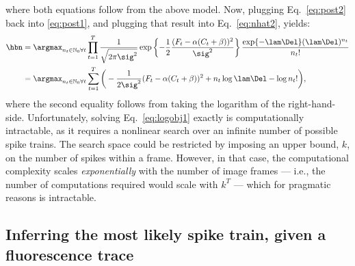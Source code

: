 where both equations follow from the above model.  Now, plugging Eq.~\eqref{eq:post2} back into \eqref{eq:post1}, and plugging that result into Eq.~\eqref{eq:nhat2}, yields:
\begin{subequations}  \label{eq:obj}
\begin{align}
\hbn 	&= \anx \prod_{t=1}^T \frac{1}{\sqrt{2 \pi \sig^2}} \exp \left\{-\frac{1}{2}\frac{(F_t - \alpha (C_t + \beta))^2}{\sig^2}\right\} \frac{\exp\{-\lam\Del\} (\lam\Del)^{n_t}}{n_t!}
\label{eq:obj1}\\ &= \anx  \sum_{t=1}^T \bigg( -\frac{1}{2 \sig^2}(F_t - \alpha(C_t + \beta))^2  +  n_t \log \lam \Del - \log n_t! \bigg), \label{eq:logobj1}
\end{align} 
\end{subequations}
\noindent where the second equality follows from taking the logarithm of the right-hand-side.  Unfortunately, solving Eq.~\eqref{eq:logobj1} exactly is computationally intractable, as it requires a nonlinear search over an infinite number of  possible spike trains.  The search space could be restricted by imposing an upper bound, $k$, on the number of spikes within a frame.  However, in that case, the computational complexity scales \emph{exponentially} with the number of image frames --- i.e.,  the number of computations required would scale with $k^T$ --- which for pragmatic reasons is intractable.




\subsection{Inferring the most likely spike train, given a fluorescence trace} \label{sec:inf}

